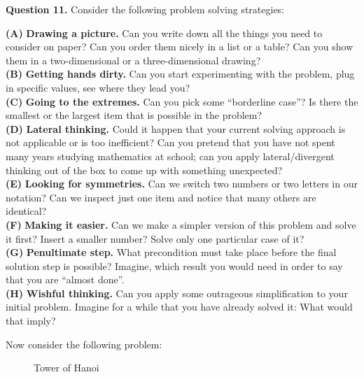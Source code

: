 \documentclass[jou]{apa6}
\begin{document}
\vspace{10pt}
{\bf Question 11.} Consider the following 
problem solving strategies: 

{\footnotesize
{\bf (A)} {\bf Drawing a picture.} Can you 
write down all the things you need to consider on paper? 
Can you order them nicely in a list or a table? 
Can you show them in a two-dimensional or a three-dimensional drawing?\\
{\bf (B)} {\bf Getting hands dirty.} Can you start experimenting with the 
problem, plug in specific values, see where they lead you?\\
{\bf (C)} {\bf Going to the extremes.} Can you pick some ``borderline case''?
Is there the smallest or the largest item that is possible in the problem?\\
{\bf (D)} {\bf Lateral thinking.} Could it happen that your current solving approach 
is not applicable or is too inefficient? Can you pretend that you 
have not spent many years studying mathematics at school; 
can you apply lateral/divergent thinking out of the box to 
come up with something unexpected?\\
{\bf (E)} {\bf Looking for symmetries.} Can we switch two numbers or two letters in our 
notation? Can we inspect just one item and notice that many others are identical?\\
{\bf (F)} {\bf Making it easier.} Can we make a simpler version of this problem and
solve it first? Insert a smaller number? Solve only one particular case of it?\\
{\bf (G)} {\bf Penultimate step.} What precondition must take place before 
the final solution step is possible? Imagine, which result you would need 
in order to say that you are ``almost done''.\\
{\bf (H)} {\bf Wishful thinking.} Can you apply some outrageous simplification to your 
initial problem. Imagine for a while that you have already solved it: What would that imply?
}

Now consider the following problem:

\begin{figure}[!htb]
\caption{\label{fig:tower-of-hanoi} Tower of Hanoi}
\end{figure}
\end{document}
